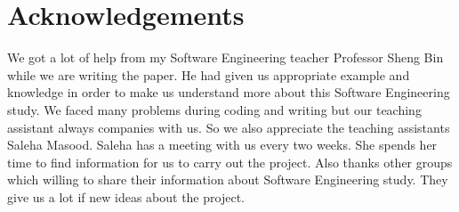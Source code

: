 \section*{Acknowledgements}
We got a lot of help from my Software Engineering teacher Professor Sheng Bin while we are writing the paper. He had given us appropriate example and knowledge in order to make us understand more about this Software Engineering study. We faced many problems during coding and writing but our teaching assistant always companies with us. So we also appreciate the teaching assistants Saleha Masood. Saleha has a meeting with us every two weeks. She spends her time to find information for us to carry out the project. Also thanks other groups which willing to share their information about Software Engineering study. They give us a lot if new ideas about the project.
